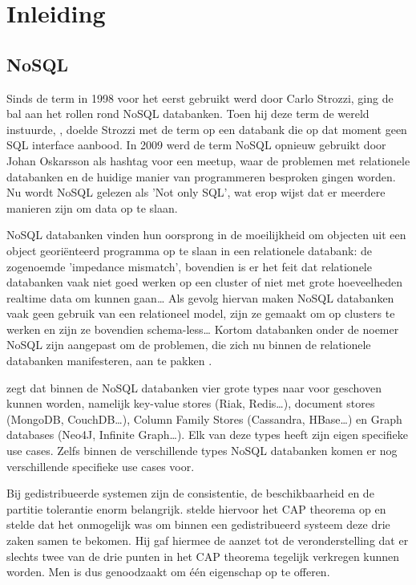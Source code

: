 \chapter{Inleiding}
\label{ch:inleiding}

\section{NoSQL}
Sinds de term in 1998 voor het eerst gebruikt werd door Carlo Strozzi, ging de bal aan het rollen rond NoSQL databanken.
Toen hij deze term de wereld instuurde, , doelde Strozzi met de term op een databank die op dat moment geen SQL interface aanbood.
In 2009 werd de term NoSQL opnieuw gebruikt door Johan Oskarsson als hashtag voor een meetup, waar de problemen met relationele databanken en de huidige manier van programmeren besproken gingen worden.
Nu wordt NoSQL gelezen als 'Not only SQL', wat erop wijst dat er meerdere manieren zijn om data op te slaan. \citep{Fowler2013Introduction}

NoSQL databanken vinden hun oorsprong in de moeilijkheid om objecten uit een object georiënteerd programma op te slaan in een relationele databank: de  zogenoemde 'impedance mismatch', bovendien is er het feit dat relationele databanken vaak niet goed werken op een cluster of niet met grote hoeveelheden realtime data om kunnen gaan\dots
Als gevolg hiervan maken NoSQL databanken vaak geen gebruik van een relationeel model, zijn ze gemaakt om op clusters te werken en zijn ze bovendien schema-less\dots
Kortom databanken onder de noemer NoSQL zijn aangepast om de problemen, die zich nu binnen de relationele databanken manifesteren, aan te pakken \citep{Fowler2012NoSQLDef}.

\cite{Sadalage2014OverviewNoSQL} zegt dat binnen de NoSQL databanken vier grote types naar voor geschoven kunnen worden, namelijk key-value stores (Riak, Redis\dots), document stores (MongoDB, CouchDB\dots), Column Family Stores (Cassandra, HBase\dots) en Graph databases (Neo4J, Infinite Graph\dots).
Elk van deze types heeft zijn eigen specifieke use cases.
Zelfs binnen de verschillende types NoSQL databanken komen er nog verschillende specifieke use cases voor.

Bij gedistribueerde systemen zijn de consistentie, de beschikbaarheid en de partitie tolerantie enorm belangrijk.
\cite{brewer2000towards} stelde hiervoor het CAP theorema op en stelde dat het onmogelijk was om binnen een gedistribueerd systeem deze drie zaken samen te bekomen.
Hij gaf hiermee de aanzet tot de veronderstelling dat er slechts twee van de drie punten in het CAP theorema tegelijk verkregen kunnen worden.
Men is dus genoodzaakt om één eigenschap op te offeren.

